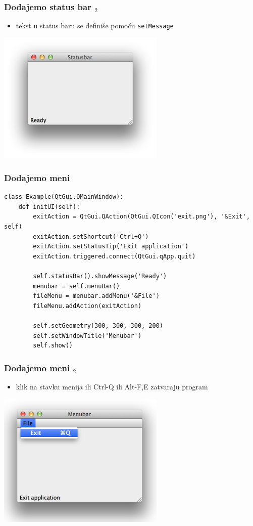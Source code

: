 \documentclass[utf8,compress]{beamer}
\begin{document}
\begin{frame}[fragile]
  \frametitle{Dodajemo status bar $_2$}
  \begin{itemize}
    \item tekst u status baru se definiše pomoću \texttt{setMessage}
  \end{itemize}
  \begin{center}
    \includegraphics[width=8cm]{pyqt02.png}
  \end{center}
\end{frame}


\begin{frame}[fragile]
  \frametitle{Dodajemo meni}
\begin{verbatim}
class Example(QtGui.QMainWindow):
    def initUI(self):                       
        exitAction = QtGui.QAction(QtGui.QIcon('exit.png'), '&Exit', self)        
        exitAction.setShortcut('Ctrl+Q')
        exitAction.setStatusTip('Exit application')
        exitAction.triggered.connect(QtGui.qApp.quit)

        self.statusBar().showMessage('Ready')
        menubar = self.menuBar()
        fileMenu = menubar.addMenu('&File')
        fileMenu.addAction(exitAction)
        
        self.setGeometry(300, 300, 300, 200)
        self.setWindowTitle('Menubar')    
        self.show()
\end{verbatim}
\end{frame}

\begin{frame}[fragile]
  \frametitle{Dodajemo meni $_2$}
  \begin{itemize}
    \item klik na stavku menija ili Ctrl-Q ili Alt-F,E zatvaraju program
  \end{itemize}
  \begin{center}
    \includegraphics[width=8cm]{pyqt03.png}
  \end{center}
\end{frame}
\end{document}
